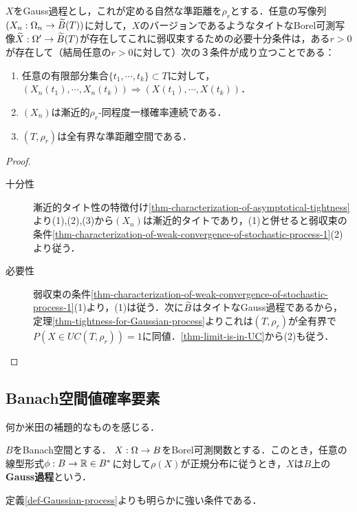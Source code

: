 \documentclass[uplatex,dvipdfmx]{jsreport}
\begin{document}
\begin{corollary}[タイトなGauss過程に弱収束する条件の特徴付け３]\label{cor-characterization-of-weak-convergence-of-Gaussian-Process}
    $X$をGauss過程とし，これが定める自然な準距離を$\rho_r$とする．任意の写像列$(X_n:\Omega_n\to\widetilde{B}(T))$に対して，$X$のバージョンであるようなタイトなBorel可測写像$\widetilde{X}:\Omega'\to\widetilde{B}(T)$が存在してこれに弱収束するための必要十分条件は，ある$r>0$が存在して（結局任意の$r>0$に対して）次の３条件が成り立つことである：
    \begin{enumerate}
        \item 任意の有限部分集合$\{t_1,\cdots,t_k\}\subset T$に対して，$(X_n(t_1),\cdots,X_n(t_k))\Rightarrow(X(t_1),\cdots,X(t_k))$．
        \item $(X_n)$は漸近的$\rho_r$-同程度一様確率連続である．
        \item $(T,\rho_r)$は全有界な準距離空間である．
    \end{enumerate}
\end{corollary}
\begin{proof}\mbox{}
    \begin{description}
        \item[十分性] 漸近的タイト性の特徴付け\ref{thm-characterization-of-asymptotical-tightness}より(1),(2),(3)から$(X_n)$は漸近的タイトであり，(1)と併せると弱収束の条件\ref{thm-characterization-of-weak-convergence-of-stochastic-process-1}(2)より従う．
        \item[必要性] 弱収束の条件\ref{thm-characterization-of-weak-convergence-of-stochastic-process-1}(1)より，(1)は従う．次に$\widetilde{B}$はタイトなGauss過程であるから，定理\ref{thm-tightness-for-Gaussian-process}よりこれは$(T,\rho_r)$が全有界で$P(X\in UC(T,\rho_r))=1$に同値．\ref{thm-limit-is-in-UC}から(2)も従う．
    \end{description}
\end{proof}

\subsection{Banach空間値確率要素}

\begin{tcolorbox}[colframe=ForestGreen, colback=ForestGreen!10!white,breakable,colbacktitle=ForestGreen!40!white,coltitle=black,fonttitle=\bfseries\sffamily,
title=]
    何か米田の補題的なものを感じる．
\end{tcolorbox}

\begin{definition}
    $B$をBanach空間とする．
    $X:\Omega\to B$をBorel可測関数とする．このとき，任意の線型形式$\phi:B\to\mathbb{R}\in B^*$に対して$\rho(X)$が正規分布に従うとき，$X$は$B$上の\textbf{Gauss過程}という．
\end{definition}
\begin{remark}
    定義\ref{def-Gaussian-process}よりも明らかに強い条件である．
\end{remark}
\end{document}
